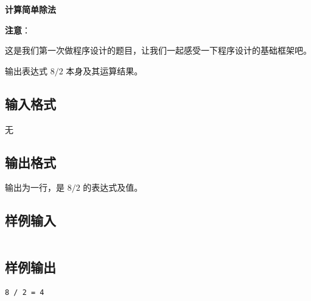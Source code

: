 \documentclass{article}
\newcommand{\problemname}[1]{\begin{center}\Large\bfseries #1\end{center}}
\begin{document}
\problemname{计算简单除法}

\textbf{注意}：

这是我们第一次做程序设计的题目，让我们一起感受一下程序设计的基础框架吧。

输出表达式 $8/2$ 本身及其运算结果。

\subsection*{输入格式}
无

\subsection*{输出格式}
输出为一行，是 $8/2$ 的表达式及值。

\subsection*{样例输入}
\begin{verbatim}

\end{verbatim}

\subsection*{样例输出}
\begin{verbatim}
8 / 2 = 4
\end{verbatim}
\end{document}
